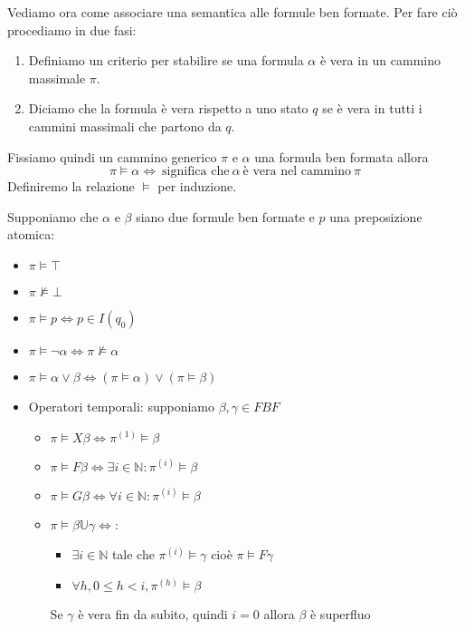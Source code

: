 Vediamo ora come associare una semantica alle formule ben formate. Per fare ciò
procediamo in due fasi:
\begin{enumerate}
    \item Definiamo un criterio per stabilire se una formula $\alpha$ è vera in
          un cammino massimale $\pi$.
    \item Diciamo che la formula è vera rispetto a uno stato $q$ se è vera in
          tutti i cammini massimali che partono da $q$.
\end{enumerate}
Fissiamo quindi un cammino generico $\pi$ e $\alpha$ una formula ben formata allora
\begin{equation}
    \pi \vDash \alpha \iff \ \text{significa che} \ \alpha \ \text{è vera nel cammino}
    \ \pi
\end{equation}
Definiremo la relazione $\vDash$ per induzione. 
\begin{definizione}
    Supponiamo che $\alpha$ e $\beta$
    siano due formule ben formate e $p$ una preposizione atomica:
    \begin{itemize}
        \item $\pi \vDash \top$
        \item $\pi \not\vDash \bot$
        \item $\pi \vDash p \iff p\in I(q_0)$
        \item $\pi \vDash \lnot \alpha \iff \pi \not\vDash \alpha$
        \item $\pi \vDash  \alpha \lor \beta \iff (\pi \vDash \alpha)\lor (\pi \vDash
                  \beta) $
        \item Operatori temporali: supponiamo $\beta, \gamma \in FBF$
              \begin{itemize}
                  \item $\pi\vDash X\beta \iff \pi^{(1)}\vDash \beta$
                  \item $\pi\vDash F\beta \iff \exists i \in \mathbb{N}:\pi^{(i)}
                            \vDash \beta$
                  \item $\pi\vDash G\beta \iff \forall i \in \mathbb{N}:\pi^{(i)}
                            \vDash \beta$
                  \item $\pi \vDash \beta \mathbb{U} \gamma \iff$:
                        \begin{itemize}
                            \item $\exists i \in \mathbb{N}$ tale che $\pi^{(i)}\vDash
                                      \gamma$ cioè $\pi\vDash F\gamma$
                            \item $\forall h, 0\le h < i, \pi^{(h)}\vDash \beta$
                        \end{itemize}
                        Se $\gamma$ è vera fin da subito, quindi $i=0$ allora $\beta$
                        è superfluo
              \end{itemize}
    \end{itemize}
\end{definizione}